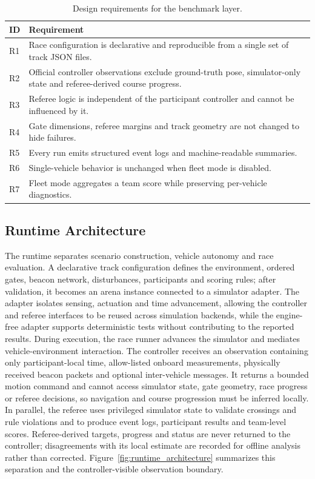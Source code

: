 \begin{table}[t]
\centering
\caption{Design requirements for the benchmark layer.}
\label{tab:requirements}
\mratablestyle
\begin{tabular}{p{}p{}}
\toprule
ID & Requirement \\
\midrule
R1 & Race configuration is declarative and reproducible from a single set of track JSON files. \\
R2 & Official controller observations exclude ground-truth pose, simulator-only state and referee-derived course progress. \\
R3 & Referee logic is independent of the participant controller and cannot be influenced by it. \\
R4 & Gate dimensions, referee margins and track geometry are not changed to hide failures. \\
R5 & Every run emits structured event logs and machine-readable summaries. \\
R6 & Single-vehicle behavior is unchanged when fleet mode is disabled. \\
R7 & Fleet mode aggregates a team score while preserving per-vehicle diagnostics. \\
\bottomrule
\end{tabular}
\end{table}

\subsection{Runtime Architecture}



The runtime separates scenario construction, vehicle autonomy and race evaluation. A declarative track configuration defines the environment, ordered gates, beacon network, disturbances, participants and scoring rules; after validation, it becomes an arena instance connected to a simulator adapter. The adapter isolates sensing, actuation and time advancement, allowing the controller and referee interfaces to be reused across simulation backends, while the engine-free adapter supports deterministic tests without contributing to the reported results. During execution, the race runner advances the simulator and mediates vehicle-environment interaction. The controller receives an observation containing only participant-local time, allow-listed onboard measurements, physically received beacon packets and optional inter-vehicle messages. It returns a bounded motion command and cannot access simulator state, gate geometry, race progress or referee decisions, so navigation and course progression must be inferred locally. In parallel, the referee uses privileged simulator state to validate crossings and rule violations and to produce event logs, participant results and team-level scores. Referee-derived targets, progress and status are never returned to the controller; disagreements with its local estimate are recorded for offline analysis rather than corrected. Figure~\ref{fig:runtime_architecture} summarizes this separation and the controller-visible observation boundary.
